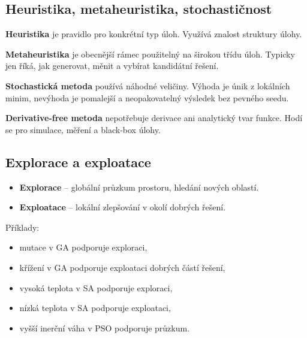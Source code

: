 \subsection*{Heuristika, metaheuristika, stochastičnost}
\textbf{Heuristika} je pravidlo pro konkrétní typ úloh. Využívá znalost struktury úlohy.

\textbf{Metaheuristika} je obecnější rámec použitelný na širokou třídu úloh. Typicky jen říká, jak generovat, měnit a vybírat kandidátní řešení.

\textbf{Stochastická metoda} používá náhodné veličiny. Výhoda je únik z lokálních minim, nevýhoda je pomalejší a neopakovatelný výsledek bez pevného seedu.

\textbf{Derivative-free metoda} nepotřebuje derivace ani analytický tvar funkce. Hodí se pro simulace, měření a black-box úlohy.

\subsection*{Explorace a exploatace}
\begin{itemize}
    \item \textbf{Explorace} -- globální průzkum prostoru, hledání nových oblastí.
    \item \textbf{Exploatace} -- lokální zlepšování v okolí dobrých řešení.
\end{itemize}

Příklady:
\begin{itemize}
    \item mutace v GA podporuje exploraci,
    \item křížení v GA podporuje exploataci dobrých částí řešení,
    \item vysoká teplota v SA podporuje exploraci,
    \item nízká teplota v SA podporuje exploataci,
    \item vyšší inerční váha v PSO podporuje průzkum.
\end{itemize}

